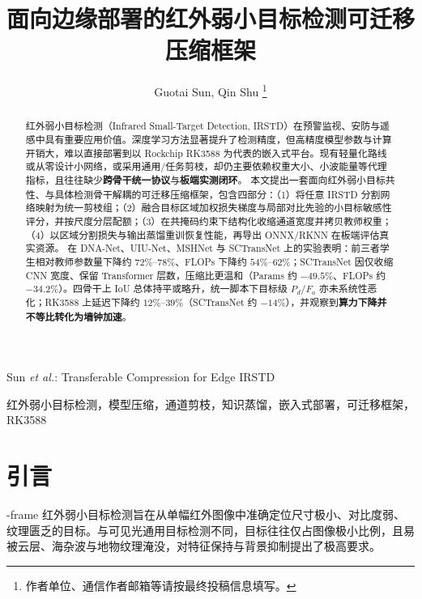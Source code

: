 \documentclass[lettersize,journal]{IEEEtran}
\begin{document}
\title{面向边缘部署的红外弱小目标检测可迁移压缩框架}

\author{Guotai Sun, Qin Shu%
\thanks{作者单位、通信作者邮箱等请按最终投稿信息填写。}}

%
{Sun \MakeLowercase{\textit{et al.}}: Transferable Compression for Edge IRSTD}


\maketitle

\begin{abstract}
红外弱小目标检测（Infrared Small-Target Detection, IRSTD）在预警监视、安防与遥感中具有重要应用价值。深度学习方法显著提升了检测精度，但高精度模型参数与计算开销大，难以直接部署到以 Rockchip RK3588 为代表的嵌入式平台。现有轻量化路线或从零设计小网络，或采用通用/任务剪枝，却仍主要依赖权重大小、小波能量等代理指标，且往往缺少\textbf{跨骨干统一协议}与\textbf{板端实测闭环}。
本文提出一套面向红外弱小目标共性、与具体检测骨干解耦的可迁移压缩框架，包含四部分：（1）将任意 IRSTD 分割网络映射为统一剪枝组；（2）融合目标区域加权损失梯度与局部对比先验的小目标敏感性评分，并按尺度分层配额；（3）在共掩码约束下结构化收缩通道宽度并拷贝教师权重；（4）以区域分割损失与输出蒸馏重训恢复性能，再导出 ONNX/RKNN 在板端评估真实资源。
在 DNA-Net、UIU-Net、MSHNet 与 SCTransNet 上的实验表明：前三者学生相对教师参数量下降约 $72\%$--$78\%$、FLOPs 下降约 $54\%$--$62\%$；SCTransNet 因仅收缩 CNN 宽度、保留 Transformer 层数，压缩比更温和（Params 约 $-49.5\%$、FLOPs 约 $-34.2\%$）。四骨干上 IoU 总体持平或略升，统一脚本下目标级 $P_d$/$F_a$ 亦未系统性恶化；RK3588 上延迟下降约 $12\%$--$39\%$（SCTransNet 约 $-14\%$），并观察到\textbf{算力下降并不等比转化为墙钟加速}。
\end{abstract}

\begin{IEEEkeywords}
红外弱小目标检测，模型压缩，通道剪枝，知识蒸馏，嵌入式部署，可迁移框架，RK3588
\end{IEEEkeywords}

\section{引言}
\label{sec:intro}
-frame 红外弱小目标检测旨在从单幅红外图像中准确定位尺寸极小、对比度弱、纹理匮乏的目标\cite{DNANet2023,ACM2021}。与可见光通用目标检测不同，目标往往仅占图像极小比例，且易被云层、海杂波与地物纹理淹没，对特征保持与背景抑制提出了极高要求。
\end{document}
